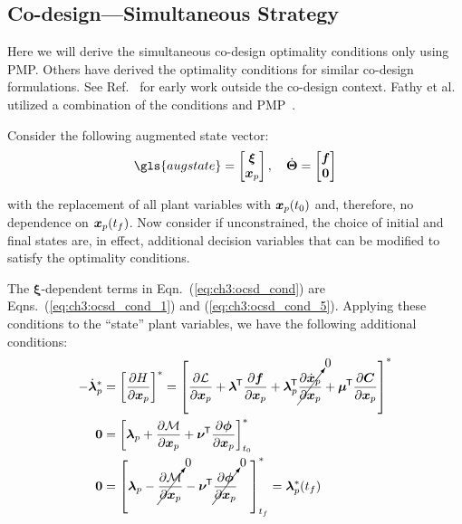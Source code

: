 \subsection{Co-design---Simultaneous Strategy}

Here we will derive the simultaneous co-design optimality conditions only using PMP.
Others have derived the optimality conditions for similar co-design formulations.
See Ref.~\cite{Dolezal1981a} for early work outside the co-design context.
Fathy et al. utilized a combination of the  conditions and PMP~\cite{Fathy2001a}.

Consider the following augmented state vector:
\begin{align}
\label{eq:ch3:augmented_states}
\gls{augstate} = \begin{bmatrix} \bxi \\ \bxp \end{bmatrix}, \quad \dot{\bm{\Theta}} = \begin{bmatrix} \bfd \\ \bzero \end{bmatrix}
\end{align}

\noindent with the replacement of all plant variables with $\bm{x}_p(t_0)$ and, therefore, no dependence on $\bm{x}_p(t_f)$. Now consider if unconstrained, the choice of initial and final states are, in effect, additional decision variables that can be modified to satisfy the optimality conditions.

The $\bm{\xi}$-dependent terms in Eqn.~(\ref{eq:ch3:ocsd_cond}) are Eqns.~(\ref{eq:ch3:ocsd_cond_1}) and (\ref{eq:ch3:ocsd_cond_5}). Applying these conditions to the ``state'' plant variables, we have the following additional conditions:
\begin{subequations}
\begin{align}
-\dot{\bm{\lambda}}^*_p &= \left[ \frac{\partial H}{\partial \bm{x}_p} \right]^* = \left[ \frac{\partial \mathcal{L}}{\partial \bm{x}_p}  + \bm{\lambda}^{\mkern-1.5mu\mathsf{T}} \frac{\partial \bm{f}}{\partial \bm{x}_p} + \bm{\lambda}_p^{\mkern-1.5mu\mathsf{T}} \cancelto{0}{\frac{\partial \dot{\bm{x}}_p}{\partial \bm{x}_p}} + \bm{\mu}^{\mkern-1.5mu\mathsf{T}} \frac{\partial \bm{C}}{\partial \bm{x}_p} \right]^*
  \\
\bm{0} &= \left[ \bm{\lambda}_p + \frac{\partial \mathcal{M}}{\partial \bm{x}_p} + \bm{\nu}^{\mkern-1.5mu\mathsf{T}} \frac{\partial \bm{\phi}}{\partial \bm{x}_p} \right]_{t_0}^*  \\
\bm{0} &= \left[ \bm{\lambda}_p - \cancelto{0}{\frac{\partial \mathcal{M}}{\partial \bm{x}_p}} - \bm{\nu}^{\mkern-1.5mu\mathsf{T}} \cancelto{0}{\frac{\partial \bm{\phi}}{\partial \bm{x}_p}} \quad \right]_{t_f}^* = \bm{\lambda}_p^*(t_f)
\end{align}
\end{subequations}

